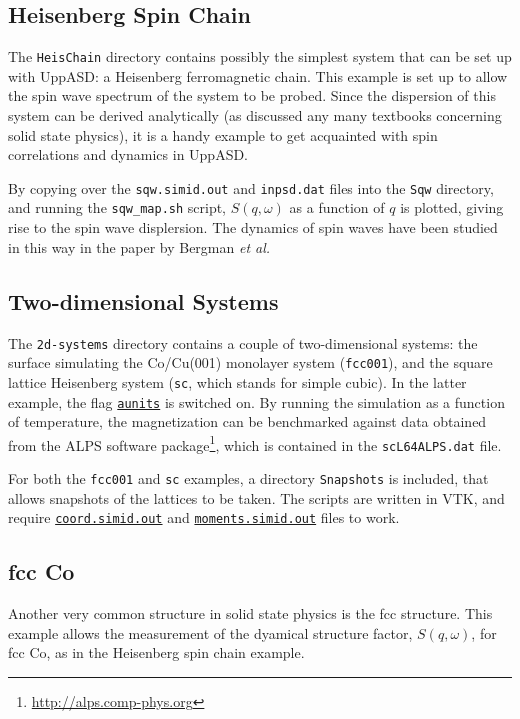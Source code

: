 \documentclass[11pt,fleqn,a4]{book} %
\newcommand{\rkeyword}[1]{\hyperref[#1]{\texttt{#1}}}
\newcommand{\rfilename}[1]{\hyperref[#1]{\texttt{#1}}}
\begin{document}
\subsection{Heisenberg Spin Chain}
The \texttt{HeisChain} directory contains possibly the simplest system that can be set up with UppASD: a Heisenberg ferromagnetic chain. This example is set up to allow the spin wave spectrum of the system to be probed. Since the dispersion of this system can be derived analytically (as discussed any many textbooks concerning solid state physics), it is a handy example to get acquainted with spin correlations and dynamics in UppASD. 

By copying over the \texttt{sqw.simid.out} and \texttt{inpsd.dat} files into the \texttt{Sqw} directory, and running the \texttt{sqw_map.sh} script, $S(q,\omega)$ as a function of $q$ is plotted, giving rise to the spin wave displersion. 
The dynamics of spin waves have been studied in this way in the paper by Bergman \textit{et al.}~\cite{Bergman2010}

\subsection{Two-dimensional Systems}
The \texttt{2d-systems} directory contains a couple of two-dimensional systems: the surface simulating the Co/Cu(001) monolayer system (\texttt{fcc001}), and the square lattice Heisenberg system (\texttt{sc}, which stands for simple cubic). In the latter example, the flag \rkeyword{aunits} is switched on. By running the simulation as a function of temperature, the magnetization can be benchmarked against data obtained from the ALPS software package\footnote{\url{http://alps.comp-phys.org}}, which is contained in the \texttt{scL64ALPS.dat} file.

For both the \texttt{fcc001} and \texttt{sc} examples, a directory \texttt{Snapshots} is included, that allows snapshots of the lattices to be taken. The scripts are written in VTK, and require \rfilename{coord.simid.out} and \rfilename{moments.simid.out} files to work.

\subsection{fcc Co}
Another very common structure in solid state physics is the fcc structure. This example allows the measurement of the dyamical structure factor, $S(q,\omega)$, for fcc Co, as in the Heisenberg spin chain example.
\end{document}
